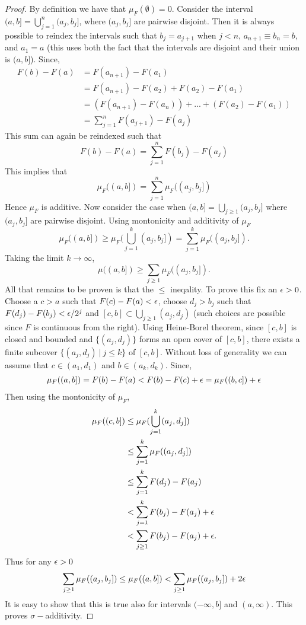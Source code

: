 \begin{proof}
  By definition we have that $\mu_F(\emptyset) = 0$. Consider the interval $(a,b] = \bigcup_{j=1}^n (a_j,b_j]$, where $(a_j,b_j]$ are pairwise disjoint. Then it is always possible to reindex the intervals such that $b_j = a_{j+1}$ when $j<n$, $a_{n+1} \equiv b_n = b$, and $a_1=a$ (this uses both the fact that the intervals are disjoint and their union is $(a,b]$). Since,
  \begin{align*}
    F(b) - F(a) &= F(a_{n+1}) - F(a_1)\\
                &= F(a_{n+1}) - F(a_2) + F(a_2) - F(a_1)\\
                &= (F(a_{n+1}) - F(a_n))+...+ (F(a_2) - F(a_1))\\
                &= \sum_{j=1}^n F(a_{j+1}) - F(a_j)
  \end{align*}
  This sum can again be reindexed such that
  \[F(b)-F(a) = \sum_{j=1}^n F(b_j) - F(a_j)\]
  This implies that
  \[\mu_F((a,b]) = \sum_{j=1}^n \mu_F((a_j,b_j])\]
  Hence $\mu_F$ is additive. Now consider the case when $(a,b] = \bigcup_{j\geq 1} (a_j,b_j]$ where $(a_j,b_j]$ are pairwise disjoint. Using montonicity and additivity of $\mu_F$
  \[\mu_F((a,b]) \geq \mu_F(\bigcup_{j=1}^k (a_j,b_j]) = \sum_{j=1}^k \mu_F((a_j,b_j]).\]
  Taking the limit $k\to\infty$,
  \[\mu((a,b]) \geq \sum_{j\geq 1} \mu_F((a_j, b_j]).\]
  All that remains to be proven is that the $\leq$ ineqality. To prove this fix an $\epsilon>0$. Choose a $c>a$ such that $F(c)-F(a)<\epsilon$, choose $d_j> b_j$ such that $F(d_j) -F(b_j) < \epsilon/2^j$ and $[c,b] \subset \bigcup_{j\geq 1} (a_j,d_j)$ (such choices are possible since $F$ is continuous from the right). Using Heine-Borel theorem, since $[c,b]$ is closed and bounded and $\{(a_j,d_j)\}$ forms an open cover of $[c,b]$, there exists a finite subcover $\{(a_j,d_j)\ |\ j\leq k\}$ of $[c,b]$. Without loss of generality we can assume that $c\in (a_1, d_1)$ and $b \in (a_k, d_k)$. Since,
  \begin{align*}
    \mu_F((a,b]) = F(b)-F(a) < F(b) - F(c) + \epsilon = \mu_F((b,c]) + \epsilon 
  \end{align*}
  Then using the montonicity of $\mu_F$,
  \begin{align*}
    \mu_F((c,b]) &\leq \mu_F(\bigcup_{j=1}^k(a_j,d_j])\\
               &\leq \sum_{j=1}^k \mu_F((a_j,d_j])\\
               &\leq \sum_{j=1}^k F(d_j) - F(a_j)\\
               &< \sum_{j=1}^k F(b_j) -F(a_j) +\epsilon\\
               &< \sum_{j\geq1} F(b_j) -F(a_j) +\epsilon.
  \end{align*}
  Thus for any $\epsilon>0$
  \[\sum_{j\geq 1} \mu_F((a_j,b_j]) \leq \mu_F((a,b]) < \sum_{j\geq 1} \mu_F((a_j,b_j]) + 2\epsilon\]
  It is easy to show that this is true also for intervals $(-\infty, b]$ and $(a,\infty)$. This proves $\sigma-$additivity. 
\end{proof}
